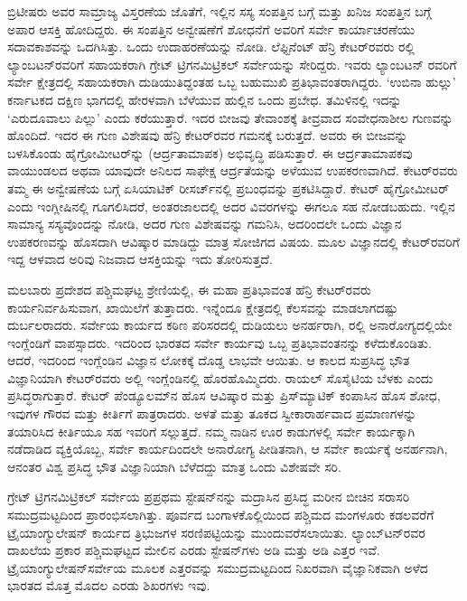 ಬ್ರಿಟೀಷರು ಅವರ ಸಾಮ್ರಾಜ್ಯ ವಿಸ್ತರಣೆಯ ಜೊತೆಗೆ, ಇಲ್ಲಿನ ಸಸ್ಯ ಸಂಪತ್ತಿನ ಬಗ್ಗೆ ಮತ್ತು ಖನಿಜ ಸಂಪತ್ತಿನ ಬಗ್ಗೆ ಅಪಾರ ಆಸಕ್ತಿ ಹೋದಿದ್ದರು. ಈ ಸಂಪತ್ತಿನ ಅನ್ವೇಷಣೆಗೆ ಶೋಧನೆಗೆ ಅವರಿಗೆ ಸರ್ವೇ ಕಾರ್ಯಾಚರಣೆಯು ಸದಾವಕಾಶವನ್ನು ಒದಗಿಸಿತ್ತು. ಒಂದು ಉದಾಹರಣೆಯನ್ನು ನೋಡಿ. ಲೆಫ್ಟಿನೆಂಟ್​ ಹೆನ್ರಿ ಕೇಟರ್​ರವರು  ರಲ್ಲಿ ಲ್ಯಾಂಬಟನ್​ರವರಿಗೆ ಸಹಾಯಕರಾಗಿ ಗ್ರೇಟ್​ ಟ್ರಿಗನಮಿಟ್ರಿಕಲ್​ ಸರ್ವೇಯನ್ನು ಸೇರಿದ್ದರು. ಇವರು ಲ್ಯಾಂಬಟನ್​ ರವರಿಗೆ ಸರ್ವೇ ಕ್ಷೇತ್ರದಲ್ಲಿ ಸಹಾಯಕರಾಗಿ ದುಡಿಯುತಿದ್ದಂತಹ ಒಬ್ಬ ಬಹುಮುಖಿ ಪ್ರತಿಭಾವಂತರಾಗಿದ್ದರು. ‘ಉಬಿನಾ ಹುಲ್ಲು’ ಕರ್ನಾಟಕದ ದಕ್ಷಿಣ ಭಾಗದಲ್ಲಿ ಹೇರಳವಾಗಿ ಬೆಳೆಯುವ ಹುಲ್ಲಿನ ಒಂದು ಪ್ರಬೇಧ. ತಮಿಳಿನಲ್ಲಿ ಇದನ್ನು ‘ಎರುದೂವಾಲು ಪಿಲ್ಲು’ ಎಂದು ಕರೆಯುತ್ತಾರೆ. ಇದರ ಬೀಜವು ತೇವಾಂಶಕ್ಕೆ ತೀವ್ರವಾದ ಸಂವೇಧನಾಶೀಲ ಗುಣವನ್ನು ಹೊಂದಿದೆ. ಇದರ ಈ ಗುಣ ವಿಶೇಷವು ಹೆನ್ರಿ ಕೇಟರ್​ರವರ ಗಮನಕ್ಕೆ ಬರುತ್ತದೆ. ಅವರು ಈ ಬೀಜವನ್ನು ಬಳಸಿಕೊಂಡು ಹೈಗ್ರೋಮೀಟರ್​ನ್ನು (ಆರ್ದ್ರತಾಮಾಪಕ) ಅಭಿವೃದ್ಧಿ ಪಡಿಸುತ್ತಾರೆ. ಈ ಆರ್ದ್ರತಾಮಾಪಕವು ವಾಯುಂಡಲದ ಅಥವಾ ಯಾವುದೇ ಅನಿಲದ ಸಾಫೇಕ್ಷ ಆರ್ದ್ರತೆಯನ್ನು ಅಳೆಯುವ ಉಪಕರಣವಾಗಿದೆ. ಕೇಟರ್​ರವರು ತಮ್ಮ ಈ ಅನ್ವೇಷಣೆಯ ಬಗ್ಗೆ ಏಸಿಯಾಟಿಕ್​ ರೀಸರ್ಚ್‌ನಲ್ಲಿ ಪ್ರಬಂಧವನ್ನು ಪ್ರಕಟಿಸಿದ್ದಾರೆ. ಕೇಟರ್​ ಹೈಗ್ರೋಮೀಟರ್​ ಎಂದು ಇಂಗ್ಲೀಷಿನಲ್ಲಿ ಗೂಗಲಿಸಿದರೆ, ಅಂತರಜಾಲದಲ್ಲಿ ಅದರ ವಿವರಗಳನ್ನು ಈಗಲೂ ಸಹ ನೋಡಬಹುದು. ಇಲ್ಲಿನ ಸಾಮಾನ್ಯ ಸಸ್ಯವೊಂದನ್ನು ನೋಡಿ, ಅದರ ಗುಣ ವಿಶೇಷವನ್ನು ಗಮನಿಸಿ, ಅದರಿಂದಲೇ ಒಂದು ವಿಜ್ಞಾನ ಉಪಕರಣವನ್ನು ಹೊಸದಾಗಿ ಆವಿಷ್ಕಾರ ಮಾಡಿದ್ದು ಮಾತ್ರ ಸೋಜಿಗದ ವಿಷಯ. ಮೂಲ ವಿಜ್ಞಾನದಲ್ಲಿ ಕೇಟರ್​ರವರಿಗೆ ಇದ್ದ ಆಳವಾದ ಅರಿವು ನಿಜವಾದ ಆಸಕ್ತಿಯನ್ನು ಇದು ತೋರಿಸುತ್ತದೆ.

ಮಲಬಾರು ಪ್ರದೇಶದ ಪಶ್ಚಿಮಘಟ್ಟ ಶ್ರೇಣಿಯಲ್ಲಿ, ಈ ಮಹಾ ಪ್ರತಿಭಾವಂತ ಹೆನ್ರಿ ಕೇಟರ್​ರವರು ಕಾರ್ಯನಿರ್ವಹಿಸುವಾಗ, ಖಾಯಿಲೆಗೆ ತುತ್ತಾದರು. ಇನ್ನೆಂದೂ ಕ್ಷೇತ್ರದಲ್ಲಿ ಕೆಲಸವನ್ನು ಮಾಡಲಾಗದಷ್ಟು ದುರ್ಬಲರಾದರು. ಸರ್ವೇಯ ಕಾರ್ಯದ ಕಠಿಣ ಪರಿಸರದಲ್ಲಿ ದುಡಿಯಲು ಅನರ್ಹರಾಗಿ,  ರಲ್ಲಿ ಅನಾರೋಗ್ಯದಲ್ಲಿಯೇ ಇಂಗ್ಲೆಂಡಿಗೆ ವಾಪಸ್ಸಾದರು. ಇದರಿಂದ ಭಾರತದ ಸರ್ವೇ ಕಾರ್ಯವು ಒಬ್ಬ ಪ್ರತಿಭಾವಂತನನ್ನು ಕಳೆದುಕೊಂಡಿತು. ಆದರೆ, ಇದರಿಂದ ಇಂಗ್ಲೆಂಡಿನ ವಿಜ್ಞಾನ ಲೋಕಕ್ಕೆ ದೊಡ್ಡ ಲಾಭವೇ ಆಯಿತು. ಆ ಕಾಲದ ಸುಪ್ರಸಿದ್ಧ ಭೌತ ವಿಜ್ಞಾನಿಯಾಗಿ ಕೇಟರ್​ರವರು ಅಲ್ಲಿ ಇಂಗ್ಲೆಂಡಿನಲ್ಲಿ ಹೊರಹೊಮ್ಮಿದರು. ರಾಯಲ್​ ಸೊಸೈಟಿಯ ಬೆಳಕು ಎಂದು ಪ್ರಸಿದ್ಧರಾಗುತ್ತಾರೆ. ಕೇಟರ್​ ಪೆಂಡ್ಯೂಲಮ್‌ನ ಹೊಸ ಆವಿಷ್ಕಾರ ಮತ್ತು ಪ್ರಿಸ್​ಮ್ಯಾಟಿಕ್​ ಕಂಪಾಸಿನ ಹೊಸ ಶೋಧ, ಇವುಗಳ ಗೌರವ ಮತ್ತು ಕೀರ್ತಿಗೆ ಪಾತ್ರರಾದರು. ಅಳತೆ ಮತ್ತು ತೂಕದ ಸ್ವೀಕಾರಾರ್ಹವಾದ ಪ್ರಮಾಣಗಳನ್ನು ತಯಾರಿಸಿದ ಕೀರ್ತಿಯೂ ಸಹ ಇವರಿಗೆ ಸಲ್ಲುತ್ತದೆ. ನಮ್ಮ ನಾಡಿನ ಊರ ಕಾಡುಗಳಲ್ಲಿ ಸರ್ವೇ ಕಾರ್ಯಕ್ಕಾಗಿ ನಡೆದಾಡಿದ ವ್ಯಕ್ತಿಯೊಬ್ಬ, ಸರ್ವೇ ಕಾರ್ಯದಿಂದಲೇ ಅನಾರೋಗ್ಯ ಪೀಡಿತನಾಗಿ, ಆ ಸರ್ವೇ ಕಾರ್ಯಕ್ಕೆ ಅನರ್ಹನಾಗಿ, ಆನಂತರ ವಿಶ್ವ ಪ್ರಸಿದ್ಧ ಭೌತ ವಿಜ್ಞಾನಿಯಾಗಿ ಬೆಳೆದದ್ದು ಮಾತ್ರ ಒಂದು ವಿಶೇಷವೇ ಸರಿ.

ಗ್ರೇಟ್​ ಟ್ರಿಗನಮಿಟ್ರಿಕಲ್​ ಸರ್ವೇಯ ಪ್ರಪ್ರಥಮ ಸ್ಟೇಷನ್​ನನ್ನು ಮದ್ರಾಸಿನ ಪ್ರಸಿದ್ಧ ಮರೀನ ಬೀಚಿನ ಸರಾಸರಿ ಸಮುದ್ರಮಟ್ಟದಿಂದ ಪ್ರಾರಂಭಿಸಲಾಗಿತ್ತು. ಪೂರ್ವದ ಬಂಗಾಳಕೊಲ್ಲಿಯಿಂದ ಪಶ್ಚಿಮದ ಮಂಗಳೂರು ಕಡಲವರೆಗೆ ಟ್ರೈಯಾಂಗ್ಯುಲೇಷನ್​ ಕಾರ್ಯದ ತ್ರಿಭುಜಗಳ ಸರಣಿಪಟ್ಟಿಯನ್ನು ಮುಂದುವರೆಸಲಾಯಿತು. ಲ್ಯಾಂಬ್​ಟನ್​ರವರ ದಾಖಲೆಯ ಪ್ರಕಾರ ಪಶ್ಚಿಮಘಟ್ಟದ ಮೇಲಿನ ಎರಡು ಸ್ಟೇಷನ್​ಗಳು  ಅಡಿ ಮತ್ತು  ಅಡಿ ಎತ್ತರ ಇವೆ. ಟ್ರೈಯಾಂಗ್ಯುಲೇಷನ್​ ಸರ್ವೇಯ ಮೂಲಕ ಎತ್ತರವನ್ನು ಸಮುದ್ರಮಟ್ಟದಿಂದ ನಿಖರವಾಗಿ ವೈಜ್ಞಾನಿಕವಾಗಿ ಅಳೆದ ಭಾರತದ ಮೊತ್ತ ಮೊದಲ ಎರಡು ಶಿಖರಗಳು ಇವು.

